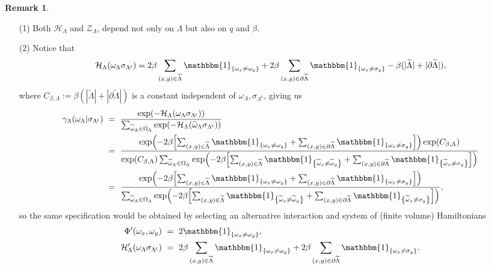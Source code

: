 \documentclass[12pt]{article}
\renewcommand{\H}{\mathcal{H}}
\newcommand{\ZZ}{\mathcal{Z}}
\newcommand{\set}[1]{\left\{#1\right\}}
\newcommand{\oklepaj}[1]{\left(#1\right)}
\newcommand{\oglati}[1]{\left[#1\right]}
\newcommand{\1}{\mathbbm{1}}
\renewcommand{\c}{\mathsf{c}}
\newcommand{\5}{\vspace{0.5cm}}
\renewcommand{\tilde}{\widetilde}
\theoremstyle{definition}
\newtheorem{rem}[thm]{Remark}
\begin{document}
\begin{rem}
\begin{itemize}
	\item[(1)] Both $\H_\Lambda$ and $\ZZ_\Lambda$, depend not only on $\Lambda$ but also on $q$ and $\beta$.
	\item[(2)] Notice that $$\H_{\Lambda}(\omega_{\Lambda}\sigma_{\Lambda^\c})=2\beta\sum_{(x,y)\in\tilde{\Lambda}}\1_{\set{\omega_x\neq\omega_y}} + 2\beta\sum_{(x,y)\in\partial\tilde{\Lambda}}\1_{\set{\omega_x\neq\sigma_y}}-\beta(|\tilde{\Lambda}|+|\partial\tilde{\Lambda}|),$$
	where $C_{\beta,\Lambda}:=\beta(|\tilde{\Lambda}|+|\partial\tilde{\Lambda}|)$ is a  constant independent of $\omega_{\Lambda},\sigma_{\Lambda^\c}$, giving us
	\begin{align*}
	\gamma_{\Lambda}(\omega_{\Lambda}|\sigma_{\Lambda^\c}) ~&=~ \frac{\exp(-\H_{\Lambda}(\omega_{\Lambda}\sigma_{\Lambda^\c}))}{\sum_{\tilde{\omega}_{\Lambda}\in\Omega_{\Lambda}}\exp(-\H_{\Lambda}(\tilde{\omega}_{\Lambda}\sigma_{\Lambda^\c}))} \\
	&=~ \frac{\exp\!\oklepaj{-2\beta\!\oglati{\sum_{(x,y)\in\tilde{\Lambda}}\1_{\set{\omega_x\neq\omega_y}} + \sum_{(x,y)\in\partial\tilde{\Lambda}}\1_{\set{\omega_x\neq\sigma_y}}}}\exp(C_{\beta,\Lambda})}{\exp(C_{\beta,\Lambda})\sum_{\tilde{\omega}_{\Lambda}\in\Omega_{\Lambda}}\exp\!\oklepaj{-2\beta\!\oglati{\sum_{(x,y)\in\tilde{\Lambda}}\1_{\set{\tilde{\omega}_x\neq\tilde{\omega}_y}} + \sum_{(x,y)\in\partial\tilde{\Lambda}}\1_{\set{\tilde{\omega}_x\neq\sigma_y}}}}} \\
	&=~ \frac{\exp\!\oklepaj{-2\beta\!\oglati{\sum_{(x,y)\in\tilde{\Lambda}}\1_{\set{\omega_x\neq\omega_y}} + \sum_{(x,y)\in\partial\tilde{\Lambda}}\1_{\set{\omega_x\neq\sigma_y}}}}}{\sum_{\tilde{\omega}_{\Lambda}\in\Omega_{\Lambda}}\exp\!\oklepaj{-2\beta\!\oglati{\sum_{(x,y)\in\tilde{\Lambda}}\1_{\set{\tilde{\omega}_x\neq\tilde{\omega}_y}} + \sum_{(x,y)\in\partial\tilde{\Lambda}}\1_{\set{\tilde{\omega}_x\neq\sigma_y}}}}},
	\end{align*}
	so the same specification would be obtained by selecting an alternative interaction and system of (finite volume) Hamiltonians
	\begin{align*}
	\Phi'(\omega_x,\omega_y) ~&=~ 2\1_{\set{\omega_x\neq\omega_y}}, \\
	\H_{\Lambda}'(\omega_{\Lambda}\sigma_{\Lambda^\c}) ~&=~ 2\beta\sum_{(x,y)\in\tilde{\Lambda}}\1_{\set{\omega_x\neq\omega_y}}+2\beta\sum_{(x,y)\in\partial\tilde{\Lambda}}\1_{\set{\omega_x\neq\sigma_y}}.
	\end{align*}

\end{itemize}
\end{rem}
\end{document}
